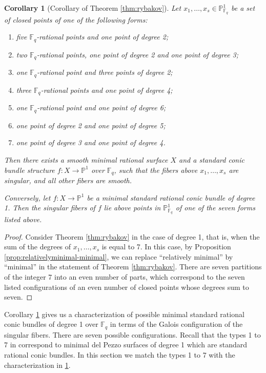\documentclass[a4paper, 11pt, reqno]{amsart}
\numberwithin{equation}{section} \numberwithin{figure}{section}
\def \F {{\mathbb F}}
\def \P {{\mathbb P}}
\newcommand{\ra}{\rightarrow}
\newtheorem{corollary}[lemma]{Corollary}
\theoremstyle{definition}
\numberwithin{lemma}{section}
\begin{document}
\begin{corollary}[Corollary of Theorem \ref{thm:rybakov}]\label{cor:rybakov}
    Let $x_1, \ldots, x_s \in \P^1_{\F_q}$ be a set of closed points of one of the following forms:
    \begin{enumerate}
        \item five $\F_q$-rational points and one point of degree 2;
        \item two $\F_q$-rational points, one point of degree 2 and one point of degree 3;
        \item one $\F_q$-rational point and three points of degree 2;
        \item three $\F_q$-rational points and one point of degree 4;
        \item one $\F_q$-rational point and one point of degree 6;
        \item one point of degree 2 and one point of degree 5;
        \item one point of degree 3 and one point of degree 4.
    \end{enumerate}
    Then there exists a smooth minimal rational surface $X$ and a standard conic bundle structure $f \colon X \ra \P^1$ over $\F_q$, such that the fibers above $x_1, \ldots, x_s$ are singular, and all other fibers are smooth. 
    
    Conversely, let $f \colon X \ra \P^1$ be a minimal standard rational conic bundle of degree 1. Then the singular fibers of $f$ lie above points in $\P^1_{\F_q}$ of one of the seven forms listed above.
\end{corollary}

\begin{proof}
    Consider Theorem \ref{thm:rybakov} in the case of degree 1, that is, when the sum of the degrees of $x_1, \ldots, x_s$ is equal to 7. In this case, by Proposition \ref{prop:relativelyminimal-minimal}, we can replace ``relatively minimal'' by ``minimal'' in the statement of Theorem \ref{thm:rybakov}. There are seven partitions of the integer 7 into an even number of parts, which correspond to the seven listed configurations of an even number of closed points whose degrees sum to seven. 
\end{proof}


Corollary \ref{cor:rybakov} gives us a characterization of possible minimal standard rational conic bundles of degree 1 over $\F_q$ in terms of the Galois configuration of the singular fibers. There are seven possible configurations. Recall that the types 1 to 7 in \cite[Table 2]{urabe2} correspond to minimal del Pezzo surfaces of degree 1 which are standard rational conic bundles. In this section we match the types 1 to 7 with the characterization in \ref{cor:rybakov}.
\end{document}

